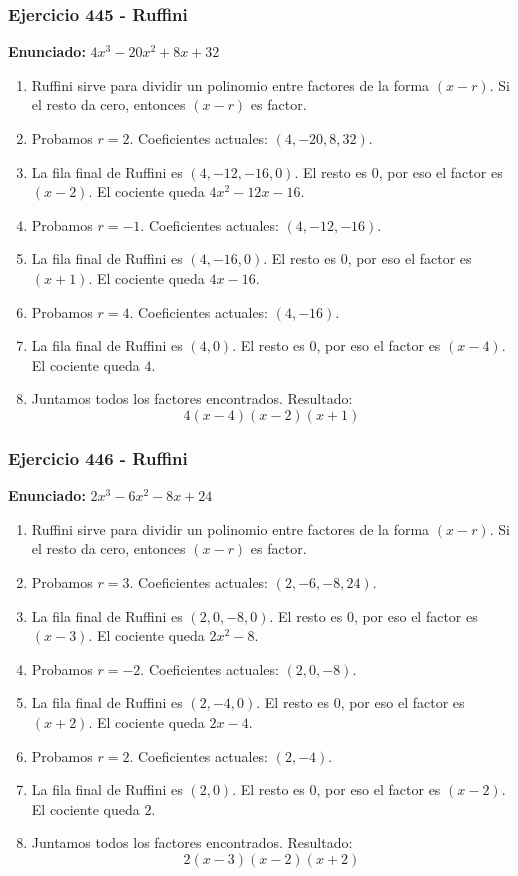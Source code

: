 \documentclass[11pt,a4paper]{article}
\begin{document}
\subsubsection*{Ejercicio 445 - Ruffini}
\textbf{Enunciado:} $ 4 x^{3} - 20 x^{2} + 8 x + 32 $\par
\begin{enumerate}[leftmargin=2em]
\item Ruffini sirve para dividir un polinomio entre factores de la forma \((x-r)\). Si el resto da cero, entonces \((x-r)\) es factor.
\item Probamos \(r=2\). Coeficientes actuales: \((4, -20, 8, 32)\).
\item La fila final de Ruffini es \((4, -12, -16, 0)\). El resto es \(0\), por eso el factor es \((x-2)\). El cociente queda \(4 x^{2} - 12 x - 16\).
\item Probamos \(r=-1\). Coeficientes actuales: \((4, -12, -16)\).
\item La fila final de Ruffini es \((4, -16, 0)\). El resto es \(0\), por eso el factor es \((x+1)\). El cociente queda \(4 x - 16\).
\item Probamos \(r=4\). Coeficientes actuales: \((4, -16)\).
\item La fila final de Ruffini es \((4, 0)\). El resto es \(0\), por eso el factor es \((x-4)\). El cociente queda \(4\).
\item Juntamos todos los factores encontrados. Resultado: \[\boxed{4 \left(x - 4\right) \left(x - 2\right) \left(x + 1\right)}\]
\end{enumerate}

\vspace{0.2cm}
\subsubsection*{Ejercicio 446 - Ruffini}
\textbf{Enunciado:} $ 2 x^{3} - 6 x^{2} - 8 x + 24 $\par
\begin{enumerate}[leftmargin=2em]
\item Ruffini sirve para dividir un polinomio entre factores de la forma \((x-r)\). Si el resto da cero, entonces \((x-r)\) es factor.
\item Probamos \(r=3\). Coeficientes actuales: \((2, -6, -8, 24)\).
\item La fila final de Ruffini es \((2, 0, -8, 0)\). El resto es \(0\), por eso el factor es \((x-3)\). El cociente queda \(2 x^{2} - 8\).
\item Probamos \(r=-2\). Coeficientes actuales: \((2, 0, -8)\).
\item La fila final de Ruffini es \((2, -4, 0)\). El resto es \(0\), por eso el factor es \((x+2)\). El cociente queda \(2 x - 4\).
\item Probamos \(r=2\). Coeficientes actuales: \((2, -4)\).
\item La fila final de Ruffini es \((2, 0)\). El resto es \(0\), por eso el factor es \((x-2)\). El cociente queda \(2\).
\item Juntamos todos los factores encontrados. Resultado: \[\boxed{2 \left(x - 3\right) \left(x - 2\right) \left(x + 2\right)}\]
\end{enumerate}
\end{document}
